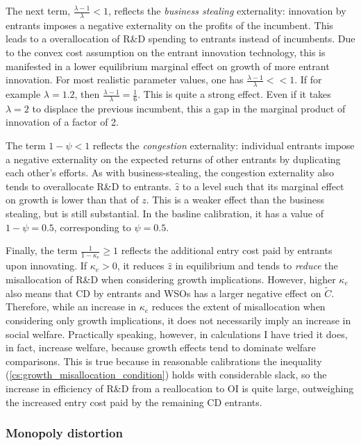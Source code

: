 \documentclass[11pt,english]{article}
\begin{document}
The next term, $\frac{\lambda - 1}{\lambda} < 1$, reflects the \textit{business stealing} externality: innovation by entrants imposes a negative externality on the profits of the incumbent. This leads to a overallocation of R\&D spending to entrants instead of incumbents. Due to the convex cost assumption on the entrant innovation technology, this is manifested in a lower equilibrium marginal effect on growth of more entrant innovation. For most realistic parameter values, one has $\frac{\lambda - 1}{\lambda} << 1$. If for example $\lambda = 1.2$, then $\frac{\lambda - 1}{\lambda} = \frac{1}{6}$. This is quite a strong effect. Even if it takes $\lambda = 2$ to displace the previous incumbent, this a gap in the marginal product of innovation of a factor of 2.

The term $1-\psi < 1$ reflects the \textit{congestion} externality: individual entrants impose a negative externality on the expected returns of other entrants by duplicating each other's efforts. As with business-stealing, the congestion externality also tends to overallocate R\&D to entrants. $\hat{z}$ to a level such that its marginal effect on growth is lower than that of $z$. This is a weaker effect than the business stealing, but is still substantial. In the basline calibration, it has a value of $1-\psi = 0.5$, corresponding to $\psi = 0.5$.

Finally, the term $\frac{1}{1-\kappa_e} \ge 1$ reflects the additional entry cost paid by entrants upon innovating. If $\kappa_e > 0$, it reduces $\hat{z}$ in equilibrium and tends to \textit{reduce} the misallocation of R\&D when considering growth implications. However, higher $\kappa_e$ also means that CD by entrants and WSOs has a larger negative effect on $\tilde{C}$. Therefore, while an increase in $\kappa_e$ reduces the extent of misallocation when considering only growth implications, it does not necessarily imply an increase in social welfare. Practically speaking, however, in calculations I have tried it does, in fact, increase welfare, because growth effects tend to dominate welfare comparisons. This is true because in reasonable calibrations the inequality (\ref{cs:growth_misallocation_condition}) holds with considerable slack, so the increase in efficiency of R\&D from a reallocation to OI is quite large, outweighing the increased entry cost paid by the remaining CD entrants.

\subsubsection{Monopoly distortion}
\end{document}
